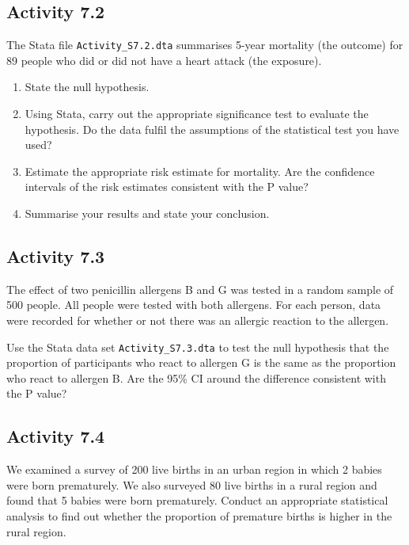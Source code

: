 \documentclass[
]{memoir}
\providecommand{\tightlist}{%
  \setlength{\itemsep}{0pt}\setlength{\parskip}{0pt}}
\begin{document}
\hypertarget{activity-7.2}{%
\subsection*{Activity 7.2}\label{activity-7.2}}

The Stata file \texttt{Activity\_S7.2.dta} summarises 5-year mortality (the outcome) for 89 people who did or did not have a heart attack (the exposure).

\begin{enumerate}
\def\labelenumi{\alph{enumi})}
\tightlist
\item
  State the null hypothesis.
\item
  Using Stata, carry out the appropriate significance test to evaluate the hypothesis. Do the data fulfil the assumptions of the statistical test you have used?
\item
  Estimate the appropriate risk estimate for mortality. Are the confidence intervals of the risk estimates consistent with the P value?
\item
  Summarise your results and state your conclusion.
\end{enumerate}

\hypertarget{activity-7.3}{%
\subsection*{Activity 7.3}\label{activity-7.3}}

The effect of two penicillin allergens B and G was tested in a random sample of 500 people. All people were tested with both allergens. For each person, data were recorded for whether or not there was an allergic reaction to the allergen.

Use the Stata data set \texttt{Activity\_S7.3.dta} to test the null hypothesis that the proportion of participants who react to allergen G is the same as the proportion who react to allergen B. Are the 95\% CI around the difference consistent with the P value?

\hypertarget{activity-7.4}{%
\subsection*{Activity 7.4}\label{activity-7.4}}

We examined a survey of 200 live births in an urban region in which 2 babies were born prematurely. We also surveyed 80 live births in a rural region and found that 5 babies were born prematurely. Conduct an appropriate statistical analysis to find out whether the proportion of premature births is higher in the rural region.
\end{document}
